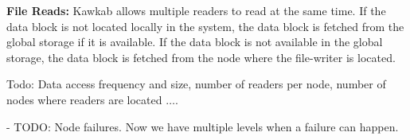 \documentclass[]{article}
\newcommand{\subtopic}[1]{\vspace{1.5pt} \noindent \textbf{#1}}
\begin{document}
\subtopic{File Reads:}
Kawkab allows multiple readers to read at the same time. If the data block
is not located locally in the system, the data block is fetched from the global storage if
it is available. If the data block is not available in the global storage, the data block
is fetched from the node where the file-writer is located.

Todo: Data access frequency and size, number of readers per node, number of
nodes where readers are located $\ldots$.




%
%
%
%
%
%






%
%
%
%
%
%
%

- TODO: Node failures. Now we have multiple levels when a failure can happen.



%
%
%
%
%
%
%
%
%
\end{document}
